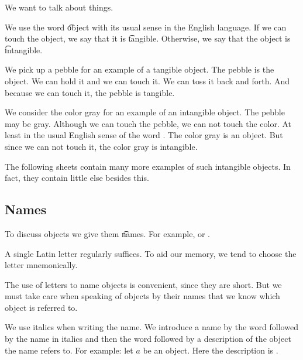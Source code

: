 

We want to talk about things.


We use the word \t{object} with its usual sense in the English language.
If we can touch the object, we say that it is \t{tangible}.
Otherwise, we say that the object is \t{intangible}.


We pick up a pebble for an example of a tangible object.
The pebble is the object.
We can hold it and we can touch it.
We can toss it back and forth.
And because we can touch it, the pebble is tangible.

We consider the color gray for an example of an intangible object.
The pebble may be gray.
Although we can touch the pebble, we can not touch the color.
At least in the usual English sense of the word .
The color gray is an object.
But since we can not touch it, the color gray is intangible.

The following sheets contain many more examples of such intangible objects.
In fact, they contain little else besides this.

\subsection{Names}

To discuss objects we give them \t{names}.
For example,  or .


A single Latin letter regularly suffices.
To aid our memory, we tend to choose the letter mnemonically.

The use of letters to name objects is convenient, since they are short.
But we must take care when speaking of objects by their names that we know which object is referred to.



We use italics when writing the name.
We introduce a name by the word  followed by the name in italics and then the word  followed by a description of the object the name refers to.
For example: let $a$ be an object.
Here the description is .

\blankpage

